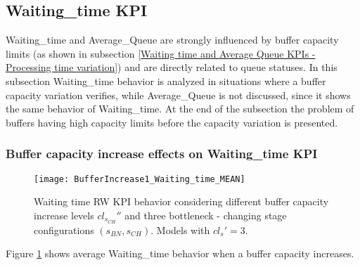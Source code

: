 \subsection{Waiting\_time KPI}
\label{Waiting time KPI - Buffer capacity variation}
Waiting\_time and Average\_Queue are strongly influenced by buffer capacity limits (as shown in subsection \ref{Waiting time and Average Queue KPIs - Processing time variation}) and are directly related to queue statuses. In this subsection Waiting\_time behavior is analyzed in situations where a buffer capacity variation verifies, while Average\_Queue is not discussed, since it shows the same behavior of Waiting\_time. At the end of the subsection the problem of buffers having high capacity limits before the capacity variation is presented.
\subsubsection{Buffer capacity increase effects on Waiting\_time KPI}
\begin{figure}[h] 
\centering
\texttt{[image: BufferIncrease1\_Waiting\_time\_MEAN]}
\caption[Waiting time RW KPI behavior with different buffer capacity increase levels]{Waiting time RW KPI behavior considering different buffer capacity increase levels $cl_{s_{CH}}''$ and three bottleneck - changing stage configurations $(s_{BN},s_{CH})$. Models with $cl_s'=3$.}
\label{fig:Waiting time RW KPI behavior with different buffer capacity increase levels}
\end{figure}
Figure \ref{fig:Waiting time RW KPI behavior with different buffer capacity increase levels} shows average Waiting\_time behavior when a buffer capacity increases.
